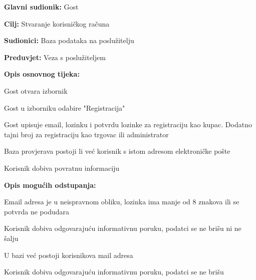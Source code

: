 				
				\noindent {}
				\begin{packed_item}
					\item \textbf{Glavni sudionik:} Gost
					\item  \textbf{Cilj:} Stvaranje korisničkog računa
					\item  \textbf{Sudionici:} Baza podataka na poslužitelju
					\item  \textbf{Preduvjet:} Veza s poslužiteljem
					\item  \textbf{Opis osnovnog tijeka:}
					\item[] \begin{packed_enum}
						\item Gost otvara izbornik
						\item Gost u izborniku odabire "Registracija"
						\item Gost upisuje email, lozinku i potvrdu lozinke za registraciju kao kupac. Dodatno tajni broj za registraciju kao trgovac ili administrator
						\item Baza provjerava postoji li već korisnik s istom adresom elektroničke pošte
						\item Korisnik dobiva povratnu informaciju
					\end{packed_enum}
					\item  \textbf{Opis mogućih odstupanja:}
					\item[] \begin{packed_item}
						\item[3.a] Email adresa je u neispravnom obliku, lozinka ima manje od 8 znakova ili se potvrda ne podudara
						\item[] \begin{packed_enum}
							\item Korisnik dobiva odgovarajuću informativnu poruku, podatci se ne brišu ni ne šalju
						\end{packed_enum}
						\item[4.a] U bazi već postoji korisnikova mail adresa
						\item[] \begin{packed_enum}
							\item Korisnik dobiva odgovarajuću informativnu poruku, podatci se ne brišu
						\end{packed_enum}
					\end{packed_item}
				\end{packed_item}
			
